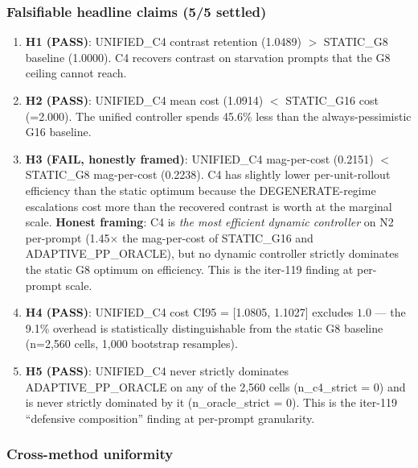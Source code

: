 \subsubsection*{Falsifiable headline claims (5/5 settled)}

\begin{enumerate}
\item \textbf{H1 (PASS)}: UNIFIED\_C4 contrast retention (1.0489) $>$ STATIC\_G8
      baseline (1.0000). C4 recovers contrast on starvation prompts that
      the G8 ceiling cannot reach.
\item \textbf{H2 (PASS)}: UNIFIED\_C4 mean cost (1.0914) $<$ STATIC\_G16 cost
      (=2.000). The unified controller spends 45.6\% less than the always-pessimistic
      G16 baseline.
\item \textbf{H3 (FAIL, honestly framed)}: UNIFIED\_C4 mag-per-cost (0.2151)
      $<$ STATIC\_G8 mag-per-cost (0.2238). C4 has slightly lower per-unit-rollout
      efficiency than the static optimum because the DEGENERATE-regime escalations
      cost more than the recovered contrast is worth at the marginal scale.
      \textbf{Honest framing}: C4 is \emph{the most efficient dynamic controller}
      on N2 per-prompt (1.45$\times$ the mag-per-cost of STATIC\_G16 and
      ADAPTIVE\_PP\_ORACLE), but no dynamic controller strictly dominates the static
      G8 optimum on efficiency. This is the iter-119 finding at per-prompt scale.
\item \textbf{H4 (PASS)}: UNIFIED\_C4 cost CI95 = [1.0805, 1.1027] excludes
      $1.0$ --- the 9.1\% overhead is statistically distinguishable from the
      static G8 baseline (n=2,560 cells, 1,000 bootstrap resamples).
\item \textbf{H5 (PASS)}: UNIFIED\_C4 never strictly dominates ADAPTIVE\_PP\_ORACLE
      on any of the 2,560 cells (n\_c4\_strict = 0) and is never strictly
      dominated by it (n\_oracle\_strict = 0). This is the iter-119
      ``defensive composition'' finding at per-prompt granularity.
\end{enumerate}

\subsubsection*{Cross-method uniformity}


